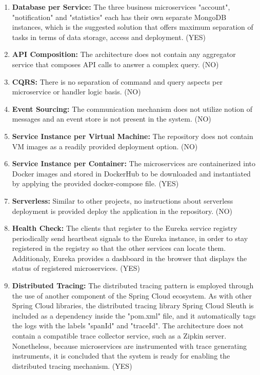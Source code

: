 \documentclass{Configuration_Files/PoliMi3i_thesis}
\begin{document}
\begin{enumerate}
    \item \textbf{Database per Service:} The three business microservices "account", "notification" and "statistics" each has their own separate MongoDB instances, which is the suggested solution that offers maximum separation of tasks in terms of data storage, access and deployment. (YES)
    
    \item \textbf{API Composition:} The architecture does not contain any aggregator service that composes API calls to answer a complex query. (NO)
    
    \item \textbf{CQRS:} There is no separation of command and query aspects per microservice or handler logic basis. (NO)
    
    \item \textbf{Event Sourcing:} The communication mechanism does not utilize notion of messages and an event store is not present in the system. (NO)
    
    \item \textbf{Service Instance per Virtual Machine:} The repository does not contain VM images as a readily provided deployment option. (NO)
    
    \item \textbf{Service Instance per Container:} The microservices are containerized into Docker images and stored in DockerHub to be downloaded and instantiated by applying the provided docker-compose file. (YES)
    
    \item \textbf{Serverless:} Similar to other projects, no instructions about serverless deployment is provided deploy the application in the repository. (NO)
    
    \item \textbf{Health Check:} The clients that register to the Eureka service registry periodically send heartbeat signals to the Eureka instance, in order to stay registered in the registry so that the other services can locate them.
    Additionaly, Eureka provides a dashboard in the browser that displays the status of registered microservices. (YES)
    
    \item \textbf{Distributed Tracing:} The distributed tracing pattern is employed through the use of another component of the Spring Cloud ecosystem.
    As with other Spring Cloud libraries, the distributed tracing library Spring Cloud Sleuth is included as a dependency inside the "pom.xml" file, and it automatically tags the logs with the labels "spanId" and "traceId".
    The architecture does not contain a compatible trace collector service, such as a Zipkin server.
    Nonetheless, because microservices are instrumented with trace generating instruments, it is concluded that the system is ready for enabling the distributed tracing mechanism. (YES)
    

\end{enumerate}
\end{document}
